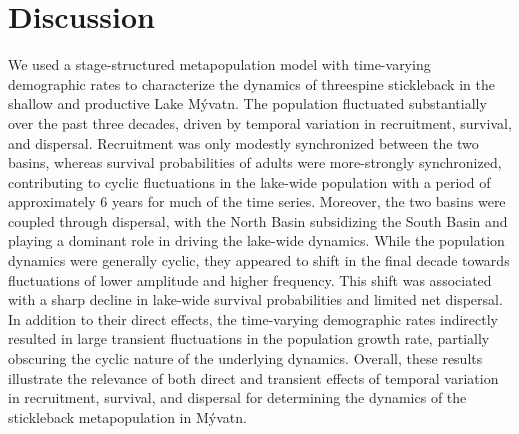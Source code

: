 \documentclass[11pt]{article}
\begin{document}
\section*{Discussion}

We used a stage-structured metapopulation model with time-varying demographic rates
to characterize the dynamics of threespine stickleback
in the shallow and productive Lake M\'{y}vatn.
The population fluctuated substantially over the past three decades,
driven by temporal variation in recruitment, survival, and dispersal.
Recruitment was only modestly synchronized between the two basins,
whereas survival probabilities of adults were more-strongly synchronized,
contributing to cyclic fluctuations in the lake-wide population with a period
of approximately 6 years for much of the time series.
Moreover, the two basins were coupled through dispersal,
with the North Basin subsidizing the South Basin
and playing a dominant role in driving the lake-wide dynamics.
While the population dynamics were generally cyclic,
they appeared to shift in the final decade towards fluctuations
of lower amplitude and higher frequency.
This shift was associated with a sharp decline in lake-wide survival probabilities
and limited net dispersal.
In addition to their direct effects,
the time-varying demographic rates indirectly resulted in large transient fluctuations
in the population growth rate,
partially obscuring the cyclic nature of the underlying dynamics.
Overall, these results illustrate the relevance of both direct and transient effects
of temporal variation in recruitment, survival, and dispersal
for determining the dynamics of the stickleback metapopulation in M\'{y}vatn.
\end{document}
